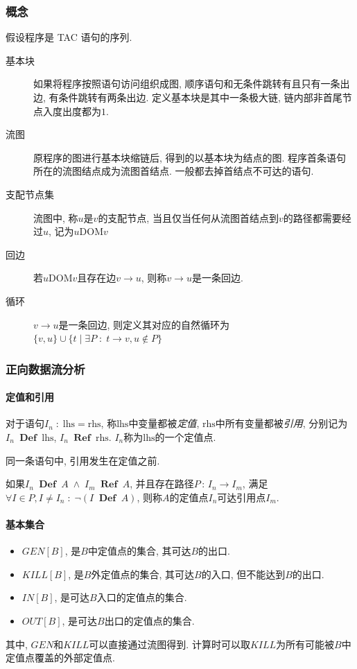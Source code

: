 \documentclass{ctexart}
\DeclareMathOperator{\Def}{\;\mathbf{Def}\;}
\DeclareMathOperator{\Ref}{\;\mathbf{Ref}\;}
\begin{document}
\subsubsection{概念}
    假设程序是 TAC 语句的序列. 
    \begin{description}
        \item[基本块] 如果将程序按照语句访问组织成图,
            顺序语句和无条件跳转有且只有一条出边,
            有条件跳转有两条出边.
            定义基本块是其中一条极大链, 链内部非首尾节点入度出度都为$1$.
        \item[流图] 原程序的图进行基本块缩链后, 得到的以基本块为结点的图.
            程序首条语句所在的流图结点成为流图首结点.
            一般都去掉首结点不可达的语句.
        \item[支配节点集] 流图中, 称$u$是$v$的支配节点, 
            当且仅当任何从流图首结点到$v$的路径都需要经过$u$, 记为$u \mathrm{DOM} v$
        \item[回边] 若$u \mathrm{DOM} v$且存在边$v\to u$, 则称$v\to u$是一条回边.
        \item[循环] $v\to u$是一条回边,
            则定义其对应的自然循环为
            $ \{v, u\} \cup \{ t \;|\; \exists P\;:\; t\to v, u \not\in P\} $
    \end{description}

\subsubsection{正向数据流分析}
\paragraph{定值和引用} 
    对于语句$I_n \;:\; \mathrm{lhs} = \mathrm{rhs}$,
    称$\mathrm{lhs}$中变量都被\emph{定值},
    $\mathrm{rhs}$中所有变量都被\emph{引用},
    分别记为$I_n \Def \mathrm{lhs}$,
        $I_n \Ref \mathrm{rhs}$.
    $I_n$称为$\mathrm{lhs}$的一个定值点.\par
    同一条语句中, 引用发生在定值之前.\par
    如果$I_n \Def A \;\land\; I_m \Ref A$,
    并且存在路径$P\,:\,I_n\to I_m$,
    满足$\forall I\in P, I \neq I_n\;:\; \neg(I \Def A)$,
    则称$A$的定值点$I_n$可达引用点$I_m$.
\paragraph{基本集合}
    \begin{itemize}
        \item $GEN[B]$, 是$B$中定值点的集合, 其可达$B$的出口.
        \item $KILL[B]$, 是$B$外定值点的集合, 其可达$B$的入口, 但不能达到$B$的出口.
        \item $IN[B]$, 是可达$B$入口的定值点的集合.
        \item $OUT[B]$, 是可达$B$出口的定值点的集合.
    \end{itemize}
    其中, $GEN$和$KILL$可以直接通过流图得到.
    计算时可以取$KILL$为所有可能被$B$中定值点覆盖的外部定值点.
\end{document}
